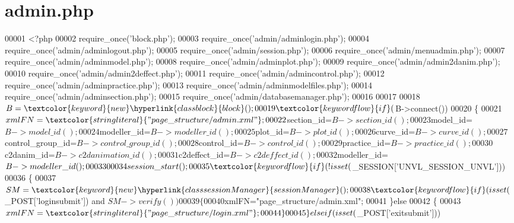 \hypertarget{admin_8php_source}{\section{admin.\-php}
}

\begin{DoxyCode}
00001 <?php
00002 require\_once(\textcolor{stringliteral}{'block.php'});
00003 require\_once(\textcolor{stringliteral}{'admin/adminlogin.php'});
00004 require\_once(\textcolor{stringliteral}{'admin/adminlogout.php'});
00005 require\_once(\textcolor{stringliteral}{'admin/session.php'});
00006 require\_once(\textcolor{stringliteral}{'admin/menuadmin.php'});
00007 require\_once(\textcolor{stringliteral}{'admin/adminmodel.php'});
00008 require\_once(\textcolor{stringliteral}{'admin/adminplot.php'});
00009 require\_once(\textcolor{stringliteral}{'admin/admin2danim.php'});
00010 require\_once(\textcolor{stringliteral}{'admin/admin2deffect.php'});
00011 require\_once(\textcolor{stringliteral}{'admin/admincontrol.php'});
00012 require\_once(\textcolor{stringliteral}{'admin/adminpractice.php'});
00013 require\_once(\textcolor{stringliteral}{'admin/adminmodelfiles.php'});
00014 require\_once(\textcolor{stringliteral}{'admin/adminsection.php'});
00015 require\_once(\textcolor{stringliteral}{'admin/databasemanager.php'});
00016 
00017 
00018 $B=\textcolor{keyword}{new} \hyperlink{classblock}{block}();
00019 \textcolor{keywordflow}{if}($B->connect())
00020 \{
00021   $xmlFN=\textcolor{stringliteral}{"page\_structure/admin.xml"};
00022   $section\_id=$B->section\_id();
00023   $model\_id=$B->model\_id();
00024   $modeller\_id=$B->modeller\_id();
00025   $plot\_id=$B->plot\_id();
00026   $curve\_id=$B->curve\_id();
00027   $control\_group\_id=$B->control\_group\_id();
00028   $control\_id=$B->control\_id();
00029   $practice\_id=$B->practice\_id();
00030   $c2danim\_id=$B->c2danimation\_id();
00031   $c2deffect\_id=$B->c2deffect\_id();
00032   $modeller\_id=$B->modeller\_id();
00033 
00034   session\_start();
00035   \textcolor{keywordflow}{if}(!isset($\_SESSION[\textcolor{stringliteral}{'UNVL\_SESSION\_UNVL'}]))
00036   \{
00037     $SM=\textcolor{keyword}{new} \hyperlink{classsessionManager}{sessionManager}();
00038     \textcolor{keywordflow}{if}(isset($\_POST[\textcolor{stringliteral}{'loginsubmit'}]) and $SM->verify())
00039     \{
00040       $xmlFN=\textcolor{stringliteral}{"page\_structure/admin.xml"};
00041     \}\textcolor{keywordflow}{else}
00042     \{
00043       $xmlFN=\textcolor{stringliteral}{"page\_structure/login.xml"};
00044     \}
00045   \}elseif(isset($\_POST[\textcolor{stringliteral}{'exitsubmit'}]))

\end{DoxyCode}

